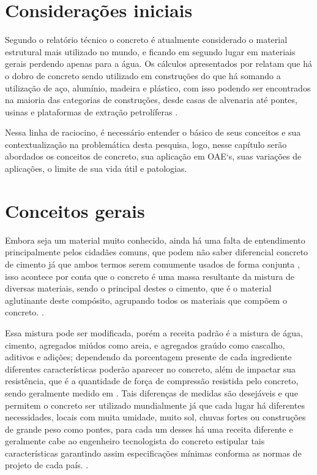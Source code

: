 \section{Considerações iniciais}

Segundo o relatório técnico  o concreto é atualmente considerado o material estrutural mais utilizado no mundo, e ficando em segundo lugar em materiais gerais perdendo apenas para a água. 
Os cálculos apresentados por  relatam que há o dobro de concreto sendo utilizado em construções do que há somando a utilização de aço, alumínio, madeira e plástico, com isso podendo ser encontrados na maioria das categorias de construções, desde casas de alvenaria até pontes, usinas e plataformas de extração petrolíferas \cite{Lima2014}.

Nessa linha de raciocino, é necessário entender o básico de seus conceitos e sua contextualização na problemática desta pesquisa, logo, nesse capítulo serão abordados os conceitos de concreto, sua aplicação em OAE`s, suas variações de aplicações, o limite de sua vida útil e patologias.

\section{Conceitos gerais}

Embora seja um material muito conhecido, ainda há uma falta de entendimento principalmente pelos cidadães comuns, que podem não saber diferencial concreto de cimento já que ambos termos serem comumente usados de forma conjunta \cite{Gagg2014}, 
isso acontece por conta que o concreto é uma massa resultante da mistura de diversas materiais, sendo o principal destes o cimento, que é o material aglutinante deste compósito, agrupando todos os materiais que compõem o concreto. \cite{allen2019fundamentals}.

Essa mistura pode ser modificada, porém a receita padrão é a mistura de água, cimento, agregados miúdos como areia, e agregados graúdo como cascalho, aditivos e adições; dependendo da porcentagem presente de cada ingrediente diferentes características poderão aparecer no concreto, além de impactar sua resistência, que é a quantidade de força de compressão resistida pelo concreto, sendo geralmente medido em  \cite{pinheiro2007fundamentos}. 
Tais diferenças de medidas são desejáveis e que permitem o concreto ser utilizado mundialmente já que cada lugar há diferentes necessidades, locais com muita umidade, muito sol, chuvas fortes ou construções de grande peso como pontes, para cada um desses há uma receita diferente e geralmente cabe ao engenheiro tecnologista do concreto estipular tais características garantindo assim especificações mínimas conforma as normas de projeto de cada país. \cite{izharcomparison}.

